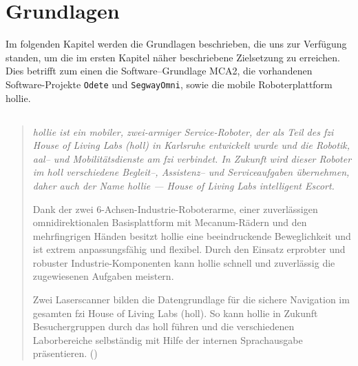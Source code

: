 \chapter{Grundlagen}
\label{grundlagen_cha}

Im folgenden Kapitel werden die Grundlagen beschrieben, die uns zur Verfügung standen, um die im ersten Kapitel näher beschriebene Zielsetzung zu erreichen.
Dies betrifft zum einen die Software--Grundlage MCA2, die vorhandenen Software-Projekte \lstinline{Odete} und \lstinline{SegwayOmni}, sowie die mobile Roboterplattform \gls{hollie}.
 
\section{}
\label{grundlagen_hollie_sec}
\authorsection{\editorjulian, \editortobias}
\begin{quotation}
\itshape
\gls{hollie} ist ein mobiler, zwei-armiger Service-Roboter, der als Teil des \gls{fzi} House of Living Labs (\gls{holl}) in Karlsruhe entwickelt wurde und die Robotik, \gls{aal}-- und Mobilitätsdienste am \gls{fzi} verbindet. In Zukunft wird dieser Roboter im \gls{holl} verschiedene Begleit--, Assistenz-- und Serviceaufgaben übernehmen, daher auch der Name \gls{hollie} --- \glqq House of Living Labs intelligent Escort\grqq .

Dank der zwei 6-Achsen-Industrie-Roboterarme, einer zuverlässigen omnidirektionalen Basisplattform mit Mecanum-Rädern und den mehrfingrigen Händen besitzt \gls{hollie} eine beeindruckende Beweglichkeit und ist extrem anpassungsfähig und flexibel. Durch den Einsatz erprobter und robuster Industrie-Komponenten kann \gls{hollie} schnell und zuverlässig die zugewiesenen Aufgaben meistern.

Zwei Laserscanner bilden die Datengrundlage für die sichere Navigation im gesamten \gls{fzi} House of Living Labs (\gls{holl}). So kann \gls{hollie} in Zukunft Besuchergruppen durch das \gls{holl} führen und die verschiedenen Laborbereiche selbständig mit Hilfe der internen Sprachausgabe präsentieren.
\normalfont(\cite{fziHoll2})
\end{quotation}

